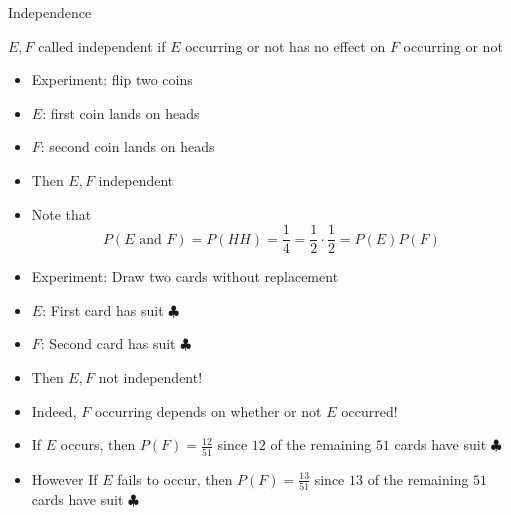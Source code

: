\documentclass[handout]{beamer}
\theoremstyle{definition}
\begin{document}
\begin{frame}{Independence}
\begin{definition}
$E,F$ called \alert{independent} if $E$
occurring or not has no effect on $F$ occurring or not
\end{definition}
\begin{example}
\begin{itemize}
\item Experiment: flip two coins
\item $E$: first coin lands on heads
\item $F$: second coin lands on heads
\item Then $E,F$ independent
\item Note that 
\[P\left(\text{$E$ and $F$}\right)=P\left(HH\right)
=\frac{1}{4}
=\frac{1}{2}\cdot\frac{1}{2}=P\left(E\right)P\left(F\right)\]
\end{itemize}
\end{example}
\end{frame}

\begin{frame}
\begin{example}
\begin{itemize}
\item Experiment: Draw two cards without replacement
\item $E$: First card has suit $\clubsuit$
\item $F$: Second card has suit $\clubsuit$
\item Then $E,F$ \alert{not} independent!
\item Indeed, $F$ occurring depends on whether or not
$E$ occurred!
\item If $E$ occurs, then $P\left(F\right)=\frac{12}{51}$
since $12$ of the remaining $51$ cards have suit $\clubsuit$
\item However If $E$ fails to occur, then $P\left(F\right)=\frac{13}{51}$
since $13$ of the remaining $51$ cards have suit $\clubsuit$
\end{itemize}
\end{example}
\end{frame}
\end{document}

